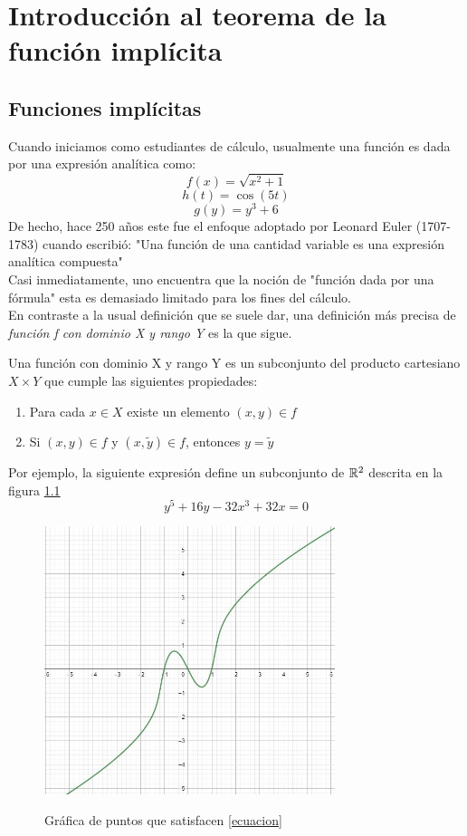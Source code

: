 \chapter{Introducción al teorema de la función implícita}
\section{Funciones implícitas}
Cuando iniciamos como estudiantes de cálculo, usualmente una función es dada por una expresión analítica como:
$$f(x)=\sqrt{x^2+1}$$
$$h(t)=\cos(5t)$$
$$g(y)=y^3+6$$
De hecho, hace 250 años este fue el enfoque adoptado por Leonard Euler (1707-1783) cuando escribió: "Una función de una cantidad variable es una expresión analítica compuesta"
\\Casi inmediatamente, uno encuentra que la noción de "función dada por una fórmula" esta es demasiado limitado para los fines del cálculo.\\En contraste a la usual definición que se suele dar, una definición más precisa de \textit{función f con dominio X y rango Y} es la que sigue.
\begin{Def}
Una función con dominio X y rango Y es un subconjunto del producto cartesiano $X\times Y$ que cumple las siguientes propiedades:
\begin{enumerate}
    \item  Para cada $x\in X$ existe un elemento $(x,y)\in f$
    \item Si $(x,y)\in f$ y $(x,\tilde{y})\in f$, entonces $y=\tilde{y}$
\end{enumerate}
\end{Def} 
Por ejemplo, la siguiente expresión define un subconjunto de ${\mathbb{R}}^2$ descrita en la figura \ref{Figura1_1}\\
\begin{equation}
    y^5+16y-32x^3+32x=0
    \label{ecuacion1}
\end{equation}
\begin{figure}[htb]
\begin{center}
\includegraphics[width=8.5cm]{figura1_1.jpg}
\label{Figura1_1}
\caption{Gráfica de puntos que satisfacen \ref{ecuacion}}
\vspace*{0.05in}
\end{center}
\end{figure}
